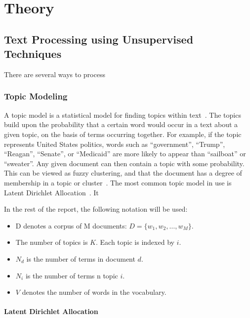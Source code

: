 \chapter{Theory}
\label{cha:theory}


\section{Text Processing using Unsupervised Techniques}

There are several ways to process  

\subsection{Topic Modeling}

A topic model is a statistical model for finding topics within text~\cite{crain2012dimensionality}.
The topics build upon the probability that a certain word would occur in a text about a given topic, on the basis of terms occurring together.
For example, if the topic represents United States politics, words such as ``government'', ``Trump'', ``Reagan'', ``Senate'', or ``Medicaid'' are more likely to appear than ``sailboat'' or ``sweater''.
Any given document can then contain a topic with some probability.
This can be viewed as fuzzy clustering, and that the document has a degree of membership in a topic or cluster~\cite{crain2012dimensionality}.
The most common topic model in use is Latent Dirichlet Allocation~\cite{crain2012dimensionality}.
It

In the rest of the report, the following notation will be used:

\begin{itemize}
    \item D denotes a corpus of M documents: $D = \{w_1, w_2, \ldots, w_M\}$.
    \item The number of topics is $K$. Each topic is indexed by $i$.
    \item $N_d$ is the number of terms in document $d$.
    \item $N_i$ is the number of terms n topic $i$.
    \item $V$ denotes the number of words in the vocabulary.
\end{itemize}

\subsubsection{Latent Dirichlet Allocation}

